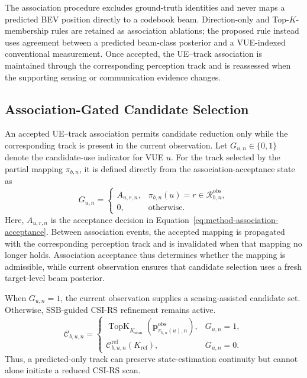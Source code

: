The association procedure excludes ground-truth identities and never maps a
predicted BEV position directly to a codebook beam.  Direction-only and
Top-\(K\)-membership rules are retained as association ablations; the proposed
rule instead uses agreement between a predicted beam-class posterior and a
VUE-indexed conventional measurement.  Once accepted, the UE--track association
is maintained through the corresponding perception track and is reassessed when
the supporting sensing or communication evidence changes.

\subsection{Association-Gated Candidate Selection}
\label{subsec:method-association-gated-selection}

An accepted UE--track association permits candidate reduction only while the
corresponding track is present in the current observation.  Let
\(G_{u,n}\in\{0,1\}\) denote the candidate-use indicator for VUE \(u\).  For
the track selected by the partial mapping \(\pi_{b,n}\), it is defined directly
from the association-acceptance state as
\begin{equation}
    G_{u,n}
    =
    \begin{cases}
        A_{u,r,n}, & \pi_{b,n}(u)=r\in
        \mathcal{R}^{\mathrm{obs}}_{b,n},\\
        0, & \text{otherwise}.
    \end{cases}
    \label{eq:method-association-gate}
\end{equation}
Here, \(A_{u,r,n}\) is the acceptance decision in
Equation~\eqref{eq:method-association-acceptance}.  Between association events,
the accepted mapping is propagated with the corresponding perception track and
is invalidated when that mapping no longer holds.  Association acceptance thus
determines whether the mapping is admissible, while current observation ensures
that candidate selection uses a fresh target-level beam posterior.

When \(G_{u,n}=1\), the current observation supplies a sensing-assisted
candidate set.  Otherwise, SSB-guided CSI-RS refinement remains active.
\begin{equation}
    \mathcal{C}_{b,u,n}
    =
    \begin{cases}
        \operatorname{TopK}_{K_{\mathrm{scan}}}\left(\mathbf{p}^{\mathrm{obs}}_{\pi_{b,n}(u),n}\right),& G_{u,n}=1,\\
        \mathcal{C}^{\mathrm{ref}}_{b,u,n}(K_{\mathrm{ref}}),& G_{u,n}=0.
    \end{cases}
    \label{eq:method-candidate-policy}
\end{equation}
Thus, a predicted-only track can preserve state-estimation continuity but cannot alone initiate a reduced CSI-RS scan.

